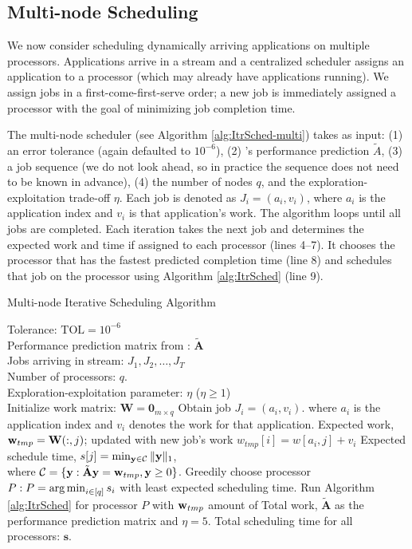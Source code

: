 \subsection{Multi-node Scheduling}
\label{sec:schedule_multi}
We now consider scheduling dynamically arriving applications on
multiple processors. Applications arrive in a stream and a centralized
scheduler assigns an application to a processor (which may already
have applications running). We assign jobs in a first-come-first-serve
order; a new job is immediately assigned a processor with the goal of
minimizing job completion time.

The multi-node scheduler (see Algorithm \ref{alg:ItrSched-multi})
takes as input: (1) an error tolerance (again defaulted to $10^{-6}$),
(2) \SYSTEMESP{}'s performance prediction $\tilde{A}$, (3) a job sequence
(we do not look ahead, so in practice the sequence does not need to be
known in advance), (4) the number of nodes $q$, and the
exploration-exploitation trade-off $\eta$.  Each job is denoted as
$J_i = (a_i,v_i)$, where $a_i$ is the application index and $v_i$ is
that application's work.  The algorithm loops until all jobs are
completed.  Each iteration takes the next job and determines the
expected work and time if assigned to each processor (lines 4--7).
It chooses the processor that has the fastest predicted completion
time (line 8) and schedules that job on the processor using Algorithm
\ref{alg:ItrSched} (line 9).

\begin{algorithm}[!t]
\caption{Multi-node Iterative Scheduling Algorithm}
\begin{algorithmic}[1]
\small
\REQUIRE Tolerance: $\text{TOL} = 10^{-6}$\\
Performance prediction matrix from \SYSTEMESP{}: $\tilde{\mathbf{A}}$ \\
Jobs arriving in stream: $J_1, J_2, \ldots, J_T $ \\
Number of processors: $q$. \\
Exploration-exploitation parameter: $\eta$ ($\eta \geq 1$) \\
\STATE Initialize work matrix: $\mathbf{W} = \mathbf{0}_{m \times q}$
\STATE Obtain job $J_i = (a_i, v_i)$. where $a_i$ is the application index and $v_i$ denotes the work for that application.
\STATE Expected work, $\mathbf{w}_{tmp} = \mathbf{W}(:,j)$; updated with new job's work $w_{tmp}[i] = w[a_i,j] + v_i$
\STATE Expected schedule time, $s[j] = \min_{\mathbf{y} \in \mathcal{C}} \|\mathbf{y}\|_1 $, \\where $ \mathcal{C} = \{ \mathbf{y}: \tilde{\mathbf{A}} \mathbf{y} = \mathbf{w}_{tmp} ,\mathbf{y} \geq 0 \}$.
\ENDFOR
\STATE Greedily choose processor $P: P = \operatorname*{arg\,min}_{i\in [q]} s_i$ with least expected scheduling time.
\STATE Run Algorithm \ref{alg:ItrSched} for processor $P$ with $\mathbf{w}_{tmp}$ amount of Total work, $\tilde{\mathbf{A}}$ as the performance prediction matrix and $\eta = 5$.
\ENDFOR
\RETURN Total scheduling time for all processors: $\mathbf{s}$.
\end{algorithmic}
\label{alg:ItrSched-multi}
\end{algorithm}
